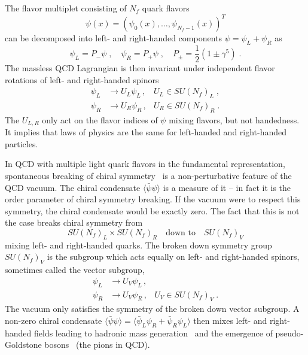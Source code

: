 The flavor multiplet consisting of $N_f$ quark flavors
\begin{equation}
\psi(x) = ( \psi_0(x), \ldots, \psi_{N_f-1}(x) )^{T}
\end{equation}
can be decomposed into left- and right-handed components $\psi = \psi_L + \psi_R$ as
\begin{equation}
\psi_L = P_{-} \psi \;,
\quad
\psi_R = P_{+} \psi \;,
\quad
P_{\pm} = \frac{1}{2} ( 1 \pm \gamma^{5}) \;.
\end{equation}
The massless QCD Lagrangian is then invariant under independent flavor rotations of left- and right-handed spinors
\begin{align}
\psi_L &\rightarrow U_L \psi_L \,, &U_L \in SU(N_f)_L \;, \\
\psi_R &\rightarrow U_R \psi_R \,, &U_R \in SU(N_f)_R \;.
\end{align}
The $U_{L,R}$ only act on the flavor indices of $\psi$ mixing flavors, but not handedness.
It implies that laws of physics are the same for left-handed and right-handed particles.

In QCD with multiple light quark flavors in the fundamental representation, spontaneous breaking of chiral symmetry~\cite{PhysRev.117.648} is a non-perturbative feature of the QCD vacuum.
The chiral condensate $\langle \bar{\psi} \psi \rangle$ is a measure of it -- in fact it is the order parameter of chiral symmetry breaking.
If the vacuum were to respect this symmetry, the chiral condensate would be exactly zero.
The fact that this is not the case breaks chiral symmetry from
\begin{equation}
SU(N_f)_L \times SU(N_f)_R
\quad
\text{down to}
\quad
SU(N_f)_V
\end{equation}
mixing left- and right-handed quarks.
The broken down symmetry group $SU(N_f)_V$ is the subgroup which acts equally on left- and right-handed spinors, sometimes called the vector subgroup,
\begin{align}
\psi_L &\rightarrow U_V \psi_L \,, \\
\psi_R &\rightarrow U_V \psi_R \,, &U_V \in SU(N_f)_V \;.
\end{align}
The vacuum only satisfies the symmetry of the broken down vector subgroup.
A non-zero chiral condensate $\langle \bar{\psi} \psi \rangle = \langle \bar{\psi}_L \psi_R + \bar{\psi}_R \psi_L \rangle$ then mixes left- and right-handed fields leading to hadronic mass generation~\cite{PhysRev.122.345} and the emergence of pseudo-Goldstone bosons~\cite{Nambu:1960xd,Goldstone:1961eq,PhysRev.127.965} (the pions in QCD).

